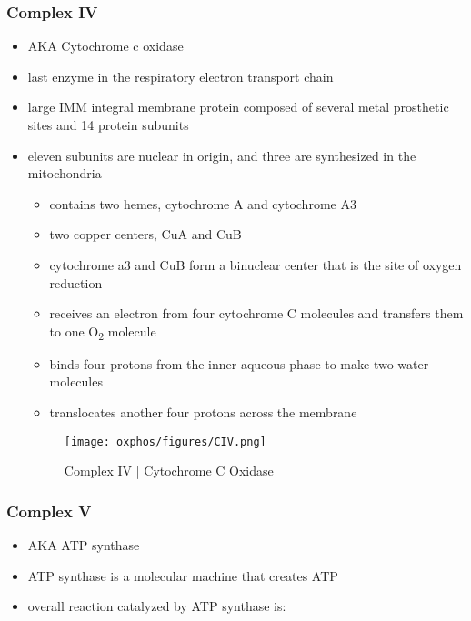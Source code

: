 \documentclass[12pt]{scrartcl}
\begin{document}
\subsubsection{Complex IV}
\label{sec:org5b382cf}
\begin{itemize}
\item AKA Cytochrome c oxidase
\item last enzyme in the respiratory electron transport chain
\item large IMM integral membrane protein composed of several metal prosthetic sites and 14 protein subunits
\item eleven subunits are nuclear in origin, and three are synthesized in the mitochondria
\begin{itemize}
\item contains two hemes, cytochrome A and cytochrome A3
\item two copper centers, CuA and CuB
\item cytochrome a3 and CuB form a binuclear center that is the site of
oxygen reduction
\item receives an electron from four cytochrome C molecules and
transfers them to one O\textsubscript{2} molecule
\end{itemize}

{\small{}}

\begin{itemize}
\item binds four protons from the inner aqueous phase to make two water
molecules
\item translocates another four protons across the membrane
\end{itemize}

\begin{figure}[htbp]
\centering
\texttt{[image: oxphos/figures/CIV.png]}
\caption[cIV]{\label{fig:orge49f2d0}Complex IV | Cytochrome C Oxidase}
\end{figure}
\end{itemize}

\subsubsection{Complex V}
\label{sec:orgc9f4fb4}
\begin{itemize}
\item AKA ATP synthase
\item ATP synthase is a molecular machine that creates ATP
\item overall reaction catalyzed by ATP synthase is:
\end{itemize}
\end{document}
